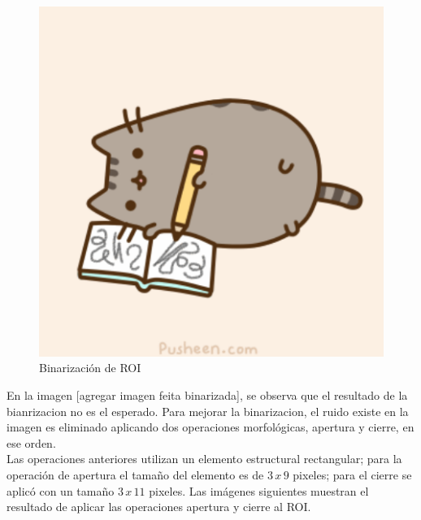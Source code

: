 \begin{figure}[h!]
\begin{center}
\includegraphics[scale=.5]{./Figures/pusheen.png}
\end{center}
\caption{Binarización de ROI}
\label{fig:BinarizationRoi}
\end{figure} 

En la imagen [agregar imagen feita binarizada], se observa que el resultado de la bianrizacion no es el esperado. Para mejorar la binarizacion, el ruido existe en la imagen es eliminado aplicando dos operaciones morfológicas, apertura y cierre, en ese orden.\\
Las operaciones anteriores utilizan un elemento estructural rectangular; para la operación de apertura el tamaño del elemento es de $3 \, x \, 9$ pixeles; para el cierre se aplic\'o con un tamaño  $3\, x \, 11$ pixeles.
Las imágenes siguientes muestran el resultado de aplicar las operaciones apertura y cierre al ROI.  

